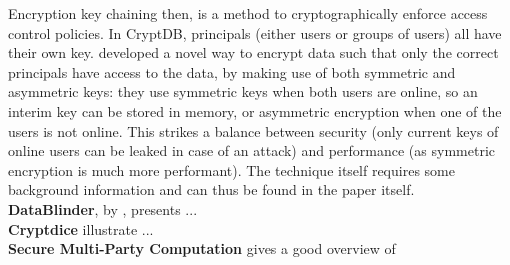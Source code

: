 Encryption key chaining then, is a method to cryptographically enforce access control policies. In CryptDB, principals (either users or groups of users) all have their own key. \citeauthor{cryptdb} developed a novel way to encrypt data such that only the correct principals have access to the data, by making use of both symmetric and asymmetric keys: they use symmetric keys when both users are online, so an interim key can be stored in memory, or asymmetric encryption when one of the users is not online. This strikes a balance between security (only current keys of online users can be leaked in case of an attack) and performance (as symmetric encryption is much more performant). The technique itself requires some background information and can thus be found in the paper itself.\\

\noindent \textbf{DataBlinder}, by \citet{datablinder}, presents ... \\

\noindent \textbf{Cryptdice} \citep{cryptdice} illustrate ...\\

\noindent \textbf{Secure Multi-Party Computation} \citep{secure-mpc} gives a good overview of\\

